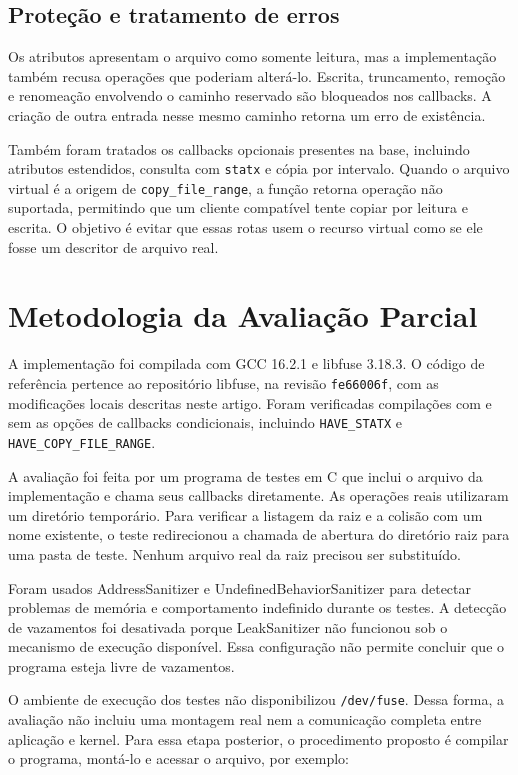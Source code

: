 \documentclass[12pt]{article}
\begin{document}
\subsection{Proteção e tratamento de erros}

Os atributos apresentam o arquivo como somente leitura, mas a
implementação também recusa operações que poderiam alterá-lo.
Escrita, truncamento, remoção e renomeação envolvendo o caminho
reservado são bloqueados nos callbacks. A criação de outra entrada
nesse mesmo caminho retorna um erro de existência.

Também foram tratados os callbacks opcionais presentes na base,
incluindo atributos estendidos, consulta com \texttt{statx} e cópia
por intervalo. Quando o arquivo virtual é a origem de
\texttt{copy\_file\_range}, a função retorna operação não suportada,
permitindo que um cliente compatível tente copiar por leitura e
escrita. O objetivo é evitar que essas rotas usem o recurso virtual
como se ele fosse um descritor de arquivo real.

\section{Metodologia da Avaliação Parcial}

A implementação foi compilada com GCC 16.2.1 e libfuse 3.18.3.
O código de referência pertence ao repositório libfuse, na revisão
\texttt{fe66006f}, com as modificações locais descritas neste artigo.
Foram verificadas compilações com e sem as opções de callbacks
condicionais, incluindo \texttt{HAVE\_STATX} e
\texttt{HAVE\_COPY\_FILE\_RANGE}.

A avaliação foi feita por um programa de testes em C que inclui o
arquivo da implementação e chama seus callbacks diretamente.
As operações reais utilizaram um diretório temporário. Para verificar
a listagem da raiz e a colisão com um nome existente, o teste
redirecionou a chamada de abertura do diretório raiz para uma pasta
de teste. Nenhum arquivo real da raiz precisou ser substituído.

Foram usados AddressSanitizer e UndefinedBehaviorSanitizer para
detectar problemas de memória e comportamento indefinido durante
os testes. A detecção de vazamentos foi desativada porque
LeakSanitizer não funcionou sob o mecanismo de execução disponível.
Essa configuração não permite concluir que o programa esteja livre
de vazamentos.

O ambiente de execução dos testes não disponibilizou
\texttt{/dev/fuse}. Dessa forma, a avaliação não incluiu uma montagem
real nem a comunicação completa entre aplicação e kernel. Para
essa etapa posterior, o procedimento proposto é compilar o programa,
montá-lo e acessar o arquivo, por exemplo:
\end{document}

